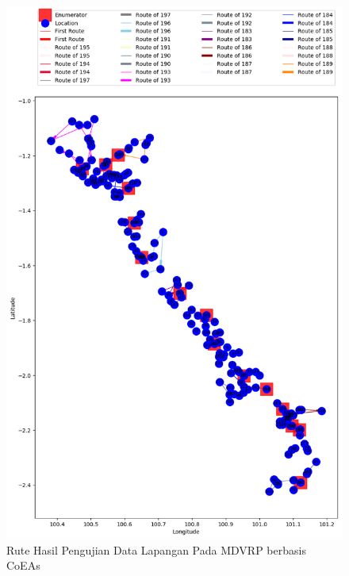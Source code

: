\begin{figure}[H]
	\centering
	\includegraphics[width=\textwidth]{Resources/Images/test_result_normal_field_m15_n182_coes}
	\caption{Rute Hasil Pengujian Data Lapangan Pada MDVRP berbasis CoEAs}
	\label{fig:test_result_normal_field_coes}
\end{figure}


